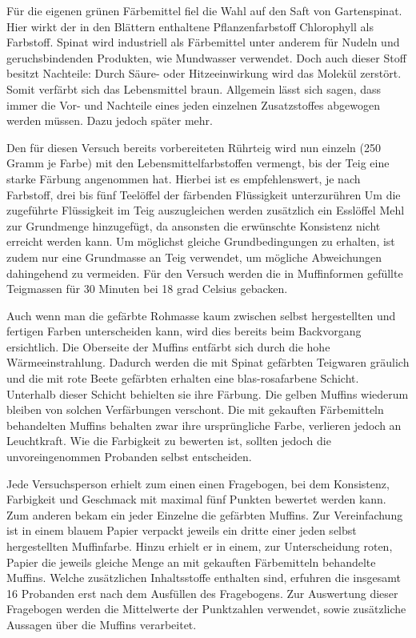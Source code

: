\documentclass[11pt]{scrreprt}
\begin{document}
  
  Für die eigenen grünen Färbemittel fiel die Wahl auf den Saft von Gartenspinat. Hier wirkt der in den Blättern enthaltene Pflanzenfarbstoff Chlorophyll als Farbstoff. Spinat wird industriell als Färbemittel unter anderem für Nudeln und geruchsbindenden Produkten, wie Mundwasser verwendet. Doch auch dieser Stoff besitzt Nachteile: Durch Säure- oder Hitzeeinwirkung wird das Molekül zerstört. Somit verfärbt sich das Lebensmittel braun.
  Allgemein lässt sich sagen, dass immer die Vor- und Nachteile eines jeden einzelnen Zusatzstoffes abgewogen werden müssen. Dazu jedoch später mehr.
  
  Den für diesen Versuch bereits  vorbereiteten Rührteig wird nun einzeln (250 Gramm je Farbe) mit den Lebensmittelfarbstoffen vermengt, bis der Teig eine starke Färbung angenommen hat. Hierbei ist es empfehlenswert, je nach Farbstoff, drei bis fünf Teelöffel der färbenden Flüssigkeit unterzurühren Um die zugeführte Flüssigkeit im Teig auszugleichen werden zusätzlich ein Esslöffel Mehl zur Grundmenge hinzugefügt, da ansonsten die erwünschte Konsistenz nicht erreicht werden kann.
Um möglichst gleiche Grundbedingungen zu erhalten, ist zudem nur eine Grundmasse an Teig verwendet, um mögliche Abweichungen dahingehend zu vermeiden. 
Für den Versuch werden die in Muffinformen gefüllte Teigmassen für 30 Minuten bei 18 grad Celsius gebacken.


Auch wenn man die gefärbte Rohmasse kaum zwischen selbst hergestellten und fertigen Farben unterscheiden kann, wird dies bereits beim Backvorgang ersichtlich. Die Oberseite der Muffins entfärbt sich durch die hohe Wärmeeinstrahlung. Dadurch werden die mit Spinat gefärbten Teigwaren gräulich und die mit rote Beete gefärbten erhalten eine blas-rosafarbene Schicht. Unterhalb dieser Schicht behielten sie ihre Färbung. Die gelben Muffins wiederum bleiben von solchen Verfärbungen verschont. Die mit gekauften Färbemitteln behandelten Muffins behalten zwar ihre ursprüngliche Farbe, verlieren jedoch an Leuchtkraft. Wie die Farbigkeit zu bewerten ist, sollten jedoch die unvoreingenommen Probanden selbst entscheiden.


Jede Versuchsperson erhielt zum einen einen Fragebogen, bei dem Konsistenz, Farbigkeit und Geschmack mit maximal fünf Punkten bewertet werden kann. Zum anderen bekam ein jeder Einzelne die gefärbten Muffins. Zur Vereinfachung ist  in einem blauem Papier verpackt jeweils ein dritte einer jeden selbst hergestellten Muffinfarbe. Hinzu erhielt er in einem, zur Unterscheidung roten, Papier die jeweils gleiche Menge an mit gekauften Färbemitteln behandelte Muffins. Welche zusätzlichen Inhaltsstoffe enthalten sind, erfuhren die insgesamt 16 Probanden erst nach dem Ausfüllen des Fragebogens.
Zur Auswertung dieser Fragebogen werden die Mittelwerte der Punktzahlen verwendet, sowie zusätzliche Aussagen über die Muffins verarbeitet.
\end{document}

